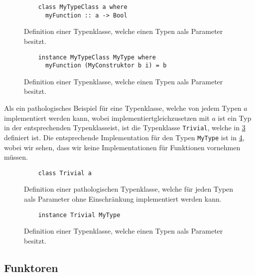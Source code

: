 \documentclass{hhuarticle}
\theoremstyle{definition}
\theoremstyle{theorem}
\begin{document}
  \begin{figure}[h]
    \begin{verbatim}
    class MyTypeClass a where
      myFunction :: a -> Bool
    \end{verbatim}
    \caption{Definition einer Typenklasse, welche einen Typen \glqq a\grqq  als Parameter besitzt.}%
    \label{fig:mytypeclass}
  \end{figure}

  \begin{figure}[h]
    \begin{verbatim}
    instance MyTypeClass MyType where
      myFunction (MyConstruktor b i) = b
    \end{verbatim}
    \caption{Definition einer Typenklasse, welche einen Typen \glqq a\grqq  als Parameter besitzt.}%
    \label{fig:mytypeinstance}
  \end{figure}

  Als ein pathologisches Beispiel für eine Typenklasse, welche von jedem
  Typen $a$ implementiert werden kann, wobei \glqq implementiert\grqq  gleichzusetzen
  mit \glqq $a$ ist ein Typ in der entsprechenden Typenklasse\grqq  ist, ist die
  Typenklasse \verb|Trivial|, welche in \cref{fig:trivialTypeClass} definiert ist.
  Die entsprechende Implementation für den Typen \verb|MyType| ist in \cref{fig:trivialTypeClassInstance},
  wobei wir sehen, dass wir keine Implementationen
  für Funktionen vornehmen müssen.

  \begin{figure}[h]
    \begin{verbatim}
    class Trivial a
    \end{verbatim}
    \caption{Definition einer pathologischen Typenklasse, welche für jeden Typen \glqq a\grqq  als Parameter ohne Einschränkung implementiert werden kann.}%
    \label{fig:trivialTypeClass}
  \end{figure}

  \begin{figure}[h]
    \begin{verbatim}
    instance Trivial MyType
    \end{verbatim}
    \caption{Definition einer Typenklasse, welche einen Typen \glqq a\grqq  als Parameter besitzt.}%
    \label{fig:trivialTypeClassInstance}
  \end{figure}

  \subsection{Funktoren}
\end{document}
